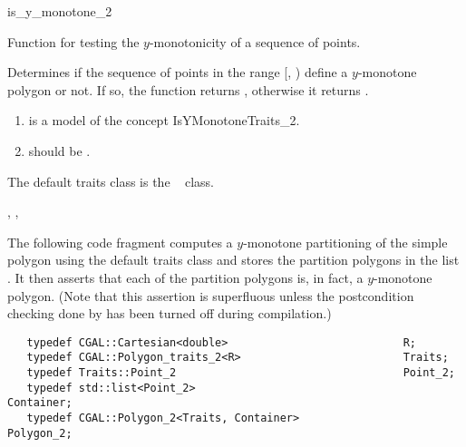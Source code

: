 \begin{ccRefFunction}{is_y_monotone_2}

\ccDefinition

Function for testing the $y$-monotonicity of a sequence of points.


{
Determines if the sequence of points in the range 
[, ) define a $y$-monotone 
polygon or not. If so, the function returns , otherwise it
returns . 
}

\begin{enumerate}
    \item {} is a model of the concept IsYMonotoneTraits\_2.%
    \item {} should be .
\end{enumerate}

The default traits class  is the \cgal\ 
class. 

\ccSeeAlso
{},
,

\ccExample

The following code fragment computes a $y$-monotone partitioning
of the simple polygon  using the default
traits class and stores the partition polygons in the list 
.  It then asserts that each of the partition 
polygons is, in fact, a $y$-monotone polygon.  (Note that this
assertion is superfluous unless the postcondition checking done
by  has been turned off during compilation.)

\begin{verbatim}
   typedef CGAL::Cartesian<double>                           R;
   typedef CGAL::Polygon_traits_2<R>                         Traits;
   typedef Traits::Point_2                                   Point_2;
   typedef std::list<Point_2>                                Container;
   typedef CGAL::Polygon_2<Traits, Container>                Polygon_2;


\end{verbatim}
\end{ccRefFunction}
